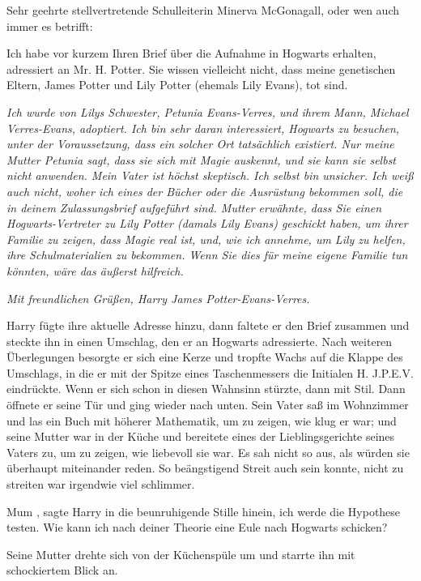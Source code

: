 Sehr geehrte stellvertretende Schulleiterin Minerva McGonagall, oder wen auch
immer es betrifft:

Ich habe vor kurzem Ihren Brief über die Aufnahme in Hogwarts erhalten,
adressiert an Mr. H. Potter. Sie wissen vielleicht nicht, dass meine genetischen
Eltern, James Potter und Lily Potter (ehemals Lily Evans), tot sind.

\emph{ Ich wurde von Lilys Schwester, Petunia Evans-Verres, und ihrem Mann,
Michael Verres-Evans, adoptiert. Ich bin sehr daran interessiert, Hogwarts zu
besuchen, unter der Voraussetzung, dass ein solcher Ort tatsächlich existiert.
Nur meine Mutter Petunia sagt, dass sie sich mit Magie auskennt, und sie kann
sie selbst nicht anwenden. Mein Vater ist höchst skeptisch. Ich selbst bin
unsicher. Ich weiß auch nicht, woher ich eines der Bücher oder die Ausrüstung
bekommen soll, die in deinem Zulassungsbrief aufgeführt sind. Mutter erwähnte,
dass Sie einen Hogwarts-Vertreter zu Lily Potter (damals Lily Evans) geschickt
haben, um ihrer Familie zu zeigen, dass Magie real ist, und, wie ich annehme, um
Lily zu helfen, ihre Schulmaterialien zu bekommen. Wenn Sie dies für meine
eigene Familie tun könnten, wäre das äußerst hilfreich. }

\emph{Mit freundlichen Grüßen, Harry James Potter-Evans-Verres.}

Harry fügte ihre aktuelle Adresse hinzu, dann faltete er den Brief zusammen und
steckte ihn in einen Umschlag, den er an Hogwarts adressierte. Nach weiteren
Überlegungen besorgte er sich eine Kerze und tropfte Wachs auf die Klappe des
Umschlags, in die er mit der Spitze eines Taschenmessers die Initialen H.
J.P.E.V. eindrückte. Wenn er sich schon in diesen Wahnsinn stürzte, dann mit
Stil. Dann öffnete er seine Tür und ging wieder nach unten. Sein Vater saß im
Wohnzimmer und las ein Buch mit höherer Mathematik, um zu zeigen, wie klug er
war; und seine Mutter war in der Küche und bereitete eines der Lieblingsgerichte
seines Vaters zu, um zu zeigen, wie liebevoll sie war. Es sah nicht so aus, als
würden sie überhaupt miteinander reden. So beängstigend Streit auch sein konnte,
nicht zu streiten war irgendwie viel schlimmer.

\glqq Mum\grqq{} , sagte Harry in die beunruhigende Stille hinein, \glqq ich werde die Hypothese
testen. Wie kann ich nach deiner Theorie eine Eule nach Hogwarts schicken?\grqq{}

Seine Mutter drehte sich von der Küchenspüle um und starrte ihn mit schockiertem
Blick an.

